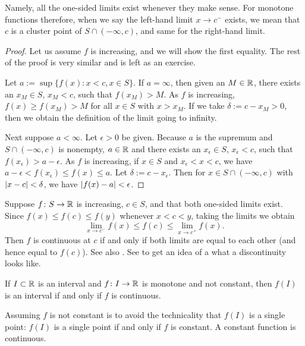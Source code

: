 Namely, all the one-sided limits exist whenever they make
sense.  For monotone functions therefore, when we say
the left-hand limit $x \to c^-$
exists, we mean that $c$ is a cluster point of $S \cap (-\infty,c)$,
and same for the right-hand limit.

\begin{proof}
Let us assume $f$ is increasing, and we will show the first
equality.  The rest of the proof is very similar and is left as an
exercise.

Let $a := \sup \{ f(x) : x < c, x \in S \}$.  If $a = \infty$,
then given an $M \in {\mathbb{R}}$, there exists an $x_M \in S$, $x_M < c$, such that $f(x_M) > M$. 
As $f$ is increasing, $f(x) \geq f(x_M) >  M$ for all $x \in S$ with $x > x_M$.  If
we take $\delta := c-x_M > 0$, then we obtain the definition of the limit going to
infinity.

Next suppose $a < \infty$.
Let $\epsilon > 0$ be given.  Because $a$ is the supremum and
$S \cap (-\infty,c)$ is nonempty, $a \in {\mathbb{R}}$ and
there exists an
$x_\epsilon \in S$,
$x_\epsilon < c$,
such that $f(x_\epsilon) > a-\epsilon$.  As $f$ is increasing,
if $x \in S$ and $x_\epsilon < x < c$, we have
$a-\epsilon < f(x_\epsilon) \leq f(x) \leq a$.  Let
$\delta := c-x_\epsilon$.  Then for $x \in S \cap (-\infty,c)$
with $\left\lvert {x-c} \right\rvert < \delta$,
we have $\left\lvert {f(x)-a} \right\rvert < \epsilon$.
\end{proof}

Suppose $f \colon S \to {\mathbb{R}}$ is increasing, $c \in S$, and
that both one-sided limits exist.
Since $f(x) \leq f(c) \leq f(y)$
whenever $x < c < y$, taking the limits we obtain
\begin{equation*}
\lim_{x \to c^-} f(x) \leq f(c) \leq \lim_{x \to c^+} f(x) .
\end{equation*}
Then $f$ is continuous at $c$ if and only if both limits are equal
to each other (and hence equal to $f(c)$).  See also
.
See  to get an idea of a what a discontinuity
looks like.


\begin{cor} \label{cor:continterval}
If $I \subset {\mathbb{R}}$ is an interval and $f \colon I \to {\mathbb{R}}$ is 
monotone and not constant, then $f(I)$ is an interval if and only if $f$
is continuous.
\end{cor}

Assuming $f$ is not constant is to avoid the technicality
that $f(I)$ is a single point: $f(I)$ is a single
point if and only if $f$ is constant.  A constant function is 
continuous.

